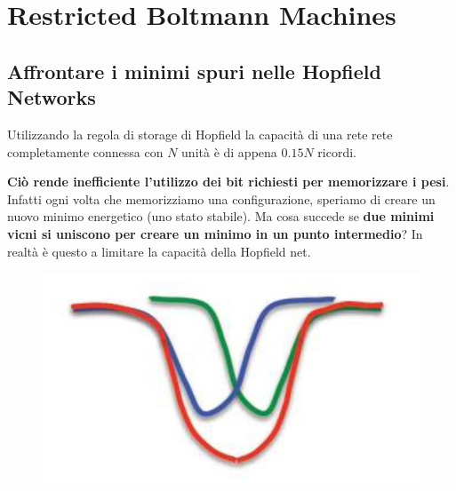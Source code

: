 \chapter{Restricted Boltmann Machines}
\section{Affrontare i minimi spuri nelle Hopfield Networks}
Utilizzando la regola di storage di Hopfield la capacità di una rete rete completamente connessa con $N$ unità è di appena $0.15N$ ricordi.


\textbf{Ciò rende inefficiente l'utilizzo dei bit richiesti per memorizzare i pesi}. Infatti ogni volta che memorizziamo una configurazione, speriamo di creare un nuovo minimo energetico (uno stato stabile). Ma cosa succede se \textbf{due minimi vicni si uniscono per creare un minimo in un punto intermedio}? In realtà è questo a limitare la capacità della Hopfield net.
\begin{figure}[!h]
    \includegraphics[scale=1]{images/rbm/minimum.png}
    \centering
\end{figure}


